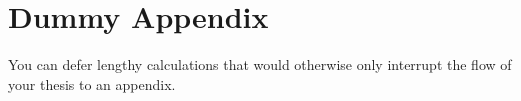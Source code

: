 \chapter{Dummy Appendix}

You can defer lengthy calculations that would otherwise only interrupt
the flow of your thesis to an appendix.
